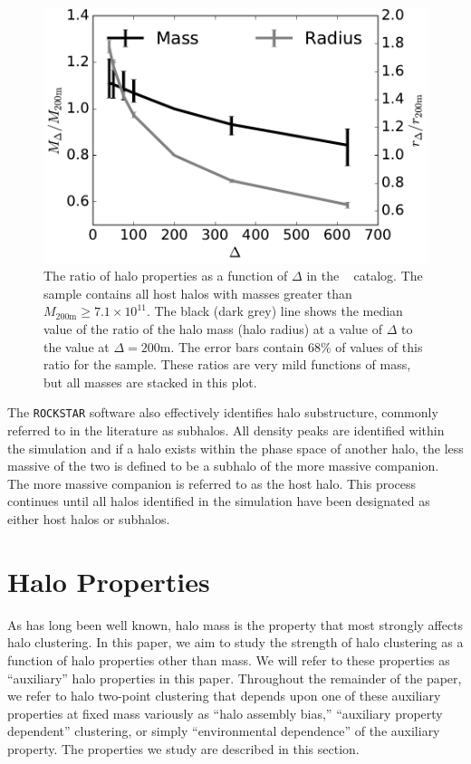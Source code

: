 \documentclass[usenatbib,fleqn]{mnras}
\begin{document}
\begin{figure}
\centering
\includegraphics[width=\columnwidth]{massvsdelta_l0250.pdf}
\caption{
The ratio of halo properties as a function of $\Delta$ in the \simB~ catalog. The sample contains all host halos with masses greater than $M_{200\mathrm{m}} \ge 7.1 \times 10^{11}$. The black (dark grey) line shows the median value of the ratio of the halo mass (halo radius) at a value of $\Delta$ to the value at $\Delta=200\mathrm{m}$. The error bars contain 68\% of values of this ratio for the sample. These ratios are 
very mild functions of mass, but all masses are stacked in this plot.}
\label{fig:deltacompare}
\end{figure}

The {\tt ROCKSTAR} software also effectively identifies halo substructure, commonly referred to in the literature as subhalos. All density peaks are identified within the simulation and if a halo exists within the phase space of another halo, the less massive of the two is defined to be a subhalo of the more massive companion. The more massive companion is referred to as the host halo. This process continues until all halos identified in the simulation have been designated as either host halos or subhalos.

\section{Halo Properties}
\label{section:haloprops}

As has long been well known, halo mass is the property that most strongly affects halo clustering. In this paper, we aim to study the strength of halo clustering as a function of halo properties other than mass. We will refer to these properties as ``auxiliary'' halo properties in this paper. Throughout the remainder of the paper, we refer to halo two-point clustering that depends upon one of these auxiliary properties at fixed mass variously as ``halo assembly bias,'' ``auxiliary property dependent'' clustering, or simply ``environmental dependence'' of the auxiliary property. The properties we study are described in this section.
\end{document}
